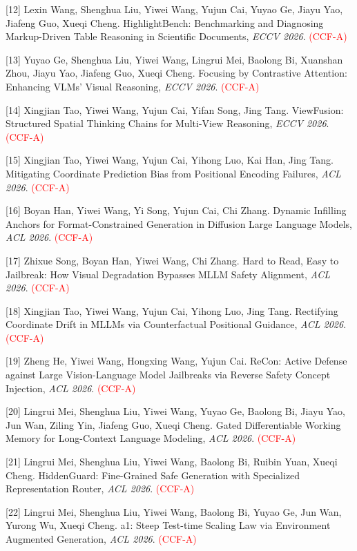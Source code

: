 [12] Lexin Wang, Shenghua Liu, Yiwei Wang, Yujun Cai, Yuyao Ge, Jiayu Yao, Jiafeng Guo, Xueqi Cheng. {HighlightBench}: Benchmarking and Diagnosing Markup-Driven Table Reasoning in Scientific Documents, \textit{ECCV 2026}. \textcolor{red}{(CCF-A)}

[13] Yuyao Ge, Shenghua Liu, Yiwei Wang, Lingrui Mei, Baolong Bi, Xuanshan Zhou, Jiayu Yao, Jiafeng Guo, Xueqi Cheng. Focusing by Contrastive Attention: Enhancing {VLMs}' Visual Reasoning, \textit{ECCV 2026}. \textcolor{red}{(CCF-A)}

[14] Xingjian Tao, Yiwei Wang, Yujun Cai, Yifan Song, Jing Tang. {ViewFusion}: Structured Spatial Thinking Chains for Multi-View Reasoning, \textit{ECCV 2026}. \textcolor{red}{(CCF-A)}

[15] Xingjian Tao, Yiwei Wang, Yujun Cai, Yihong Luo, Kai Han, Jing Tang. Mitigating Coordinate Prediction Bias from Positional Encoding Failures, \textit{ACL 2026}. \textcolor{red}{(CCF-A)}

[16] Boyan Han, Yiwei Wang, Yi Song, Yujun Cai, Chi Zhang. Dynamic Infilling Anchors for Format-Constrained Generation in Diffusion Large Language Models, \textit{ACL 2026}. \textcolor{red}{(CCF-A)}

[17] Zhixue Song, Boyan Han, Yiwei Wang, Chi Zhang. Hard to Read, Easy to Jailbreak: How Visual Degradation Bypasses MLLM Safety Alignment, \textit{ACL 2026}. \textcolor{red}{(CCF-A)}

[18] Xingjian Tao, Yiwei Wang, Yujun Cai, Yihong Luo, Jing Tang. Rectifying Coordinate Drift in MLLMs via Counterfactual Positional Guidance, \textit{ACL 2026}. \textcolor{red}{(CCF-A)}

[19] Zheng He, Yiwei Wang, Hongxing Wang, Yujun Cai. ReCon: Active Defense against Large Vision-Language Model Jailbreaks via Reverse Safety Concept Injection, \textit{ACL 2026}. \textcolor{red}{(CCF-A)}

[20] Lingrui Mei, Shenghua Liu, Yiwei Wang, Yuyao Ge, Baolong Bi, Jiayu Yao, Jun Wan, Ziling Yin, Jiafeng Guo, Xueqi Cheng. Gated Differentiable Working Memory for Long-Context Language Modeling, \textit{ACL 2026}. \textcolor{red}{(CCF-A)}

[21] Lingrui Mei, Shenghua Liu, Yiwei Wang, Baolong Bi, Ruibin Yuan, Xueqi Cheng. HiddenGuard: Fine-Grained Safe Generation with Specialized Representation Router, \textit{ACL 2026}. \textcolor{red}{(CCF-A)}

[22] Lingrui Mei, Shenghua Liu, Yiwei Wang, Baolong Bi, Yuyao Ge, Jun Wan, Yurong Wu, Xueqi Cheng. a1: Steep Test-time Scaling Law via Environment Augmented Generation, \textit{ACL 2026}. \textcolor{red}{(CCF-A)}

